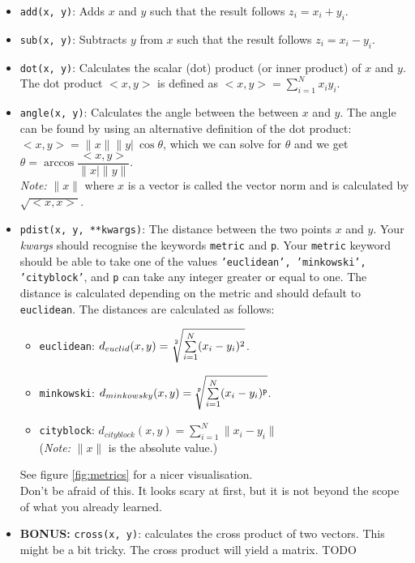 \begin{itemize}
  \item \texttt{add(x, y)}: Adds $x$ and $y$ such that the result follows $z_i = x_i + y_i$.
  \item \texttt{sub(x, y)}: Subtracts $y$ from $x$ such that the result follows $z_i = x_i - y_i$.
  \item \texttt{dot(x, y)}: Calculates the scalar (dot) product (or inner product) of $x$ and $y$. The dot product $<x,y>$ is defined as $<x,y> = \sum\limits_{i=1}^{N}x_iy_i$.
  \item \texttt{angle(x, y)}: Calculates the angle between the between $x$ and $y$. The angle can be found by using an alternative definition of the dot product: $<x,y> = \|x\|\|y|\ \cos\theta$, which we can solve for $\theta$ and we get $\theta = \arccos\dfrac{<x,y>}{\|x|\|y\|}$.\\
  \emph{Note:} $\|x\|$ where $x$ is a vector is called the vector norm and is calculated by $\sqrt{<x,x>}$.
  \item \texttt{pdist(x, y, **kwargs)}: The distance between the two points $x$ and $y$. Your \textit{kwargs} should recognise the keywords \texttt{metric} and \texttt{p}. Your \texttt{metric} keyword should be able to take one of the values \texttt{'euclidean', 'minkowski', 'cityblock'}, and \texttt{p} can take any integer greater or equal to one. The distance is calculated depending on the metric and should default to \texttt{euclidean}. The distances are calculated as follows:
    \begin{itemize}
      \item \texttt{euclidean}: $d_{euclid} (x,y) = \sqrt[\uproot{2}2]{\sum\limits_{i=1}^N (x_i-y_i)^2}$.
      \item \texttt{minkowski}: $d_{minkowsky} (x,y) = \sqrt[\uproot{2}\texttt{p}]{\sum\limits_{i=1}^N (x_i-y_i)^\texttt{p}}$.
      \item \texttt{cityblock}: $d_{cityblock} (x,y) = \sum\limits_{i=1}^N \|x_i-y_i\|$\\
      (\emph{Note:} $\|x\|$ is the absolute value.)
    \end{itemize}
    See figure \ref{fig:metrics} for a nicer visualisation.\\
    Don't be afraid of this. It looks scary at first, but it is not beyond the scope of what you already learned.
  \item \textbf{BONUS:} \texttt{cross(x, y)}: calculates the cross product of two vectors. This might be a bit tricky. The cross product will yield a matrix. \Large{TODO}
\end{itemize}
